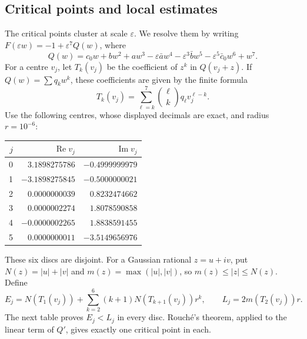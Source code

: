 \subsection{Critical points and local estimates}\label{subsec:counterexample-critical}

The critical points cluster at scale $\varepsilon$. We resolve them by
writing $F(\varepsilon w)=-1+\varepsilon^7 Q(w)$, where
\[
 Q(w)=c_0w+bw^2+aw^3-\varepsilon\bar a w^4
       -\varepsilon^3\bar b w^5-\varepsilon^5\bar c_0 w^6+w^7.
\]
For a centre $v_j$, let $T_k(v_j)$ be the coefficient of $z^k$ in
$Q(v_j+z)$. If $Q(w)=\sum q_kw^k$, these coefficients are given by the
finite formula
\[
 T_k(v_j)=\sum_{\ell=k}^7{\ell\choose k}q_\ell v_j^{\ell-k}.
\]
Use the following centres, whose displayed decimals are exact, and radius
$r=10^{-6}$:
\begin{center}\small
\begin{tabular}{@{}rrr@{}}
\toprule
$j$&$\operatorname{Re}v_j$&$\operatorname{Im}v_j$\\
\midrule
0&$3.1898275786$&$-0.4999999979$\\
1&$-3.1898275845$&$-0.5000000021$\\
2&$0.0000000039$&$0.8232474662$\\
3&$0.0000002274$&$1.8078590858$\\
4&$-0.0000002265$&$1.8838591455$\\
5&$0.0000000011$&$-3.5149656976$\\
\bottomrule
\end{tabular}
\end{center}
These six discs are disjoint. For a Gaussian rational $z=u+iv$, put
$N(z)=|u|+|v|$ and $m(z)=\max(|u|,|v|)$, so
$m(z)\le|z|\le N(z)$. Define
\[
 E_j=N(T_1(v_j))+\sum_{k=2}^{6}(k+1)N(T_{k+1}(v_j))r^k,
 \qquad L_j=2m(T_2(v_j))r.
\]
The next table proves $E_j<L_j$ in every disc. Rouch\'e's theorem, applied
to the linear term of $Q'$, gives exactly one critical point in each.

